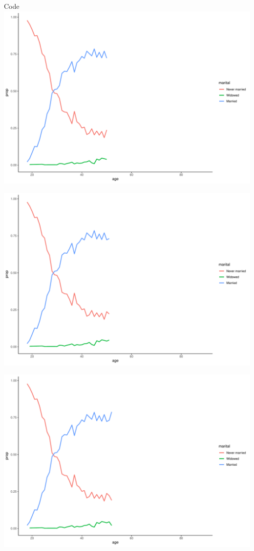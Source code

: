 \documentclass[
  ignorenonframetext,
]{beamer}
\begin{document}
\begin{frame}[fragile]{Code}
\includegraphics{gss_cat_files/figure-beamer/unnamed-chunk-1-50.pdf}

\includegraphics{gss_cat_files/figure-beamer/unnamed-chunk-1-51.pdf}

\includegraphics{gss_cat_files/figure-beamer/unnamed-chunk-1-52.pdf}


\end{frame}
\end{document}
